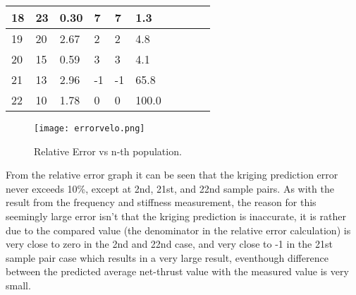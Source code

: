 \begin{table}[H]
\begin{tabular}{|l|l|l|l|l|l|}
\hline
18                  & 23                                                             & 0.30                                                             & 7         & 7                                                                           & 1.3                                                                             \\ 
\hline
19                  & 20                                                             & 2.67                                                             & 2         & 2                                                                           & 4.8                                                                             \\ 
\hline
20                  & 15                                                             & 0.59                                                             & 3         & 3                                                                           & 4.1                                                                             \\ 
\hline
21                  & 13                                                             & 2.96                                                             & -1        & -1                                                                          & 65.8~ ~ ~ ~ ~~                                                                  \\ 
\hline
22                  & 10                                                        & 1.78                                                        & 0         & 0                                                                           & 100.0~~                                                                         \\
\hline
\end{tabular}
\label{tab:tableresultvelo}
\end{table}
\begin{figure}[H]
    \centering
    \texttt{[image: errorvelo.png]}
    \caption{Relative Error vs n-th population.}
    \label{fig:errorvelo}
\end{figure}
From the relative error graph it can be seen that the kriging prediction error never exceeds 10\%, except at 2nd, 21st, and 22nd sample pairs. As with the result from the frequency and stiffness measurement, the reason for this seemingly large error isn't that the kriging prediction is inaccurate, it is rather due to the compared value (the denominator in the relative error calculation) is very close to zero in the 2nd and 22nd case, and very close to -1 in the 21st sample pair case which results in a very large result, eventhough difference between the predicted average net-thrust value with the measured value is very small.
